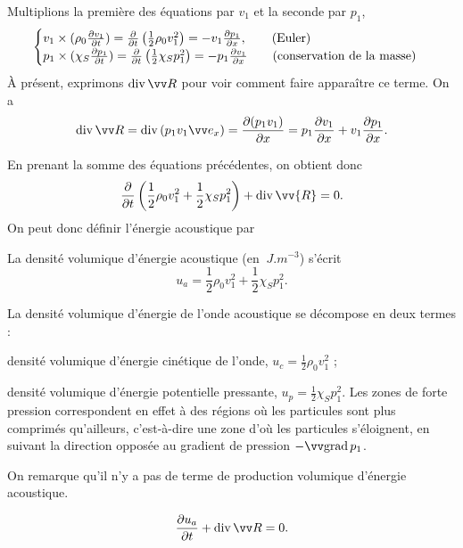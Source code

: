\documentclass[12pt,fancy]{cours}
\begin{document}
Multiplions la première des équations  par $v_1$ et la seconde par $p_1$,
\begin{equation}
\begin{subequations}
  \begin{cases}
  v_1\times(\rho_0\frac{\partial v_1}{\partial t}) = \frac{\partial }{\partial t}\left(\frac{1}{2}\rho_0 v_1^2\right)=-v_1\frac{\partial p_1}{\partial x}, \qquad \text{(Euler)}\\
    p_1\times(\chi_S\frac{\partial p_1}{\partial t}) = \frac{\partial }{\partial t}\left(\frac{1}{2}\chi_S p_1^2\right)=-p_1 \frac{\partial v_1}{\partial x}\qquad \text{(conservation de la masse)}\\
  \end{cases}
	\end{subequations}
  \end{equation}
	À présent, exprimons $\dive \Vec{R}$ pour voir comment faire apparaître ce terme. On a
\begin{equation}
	\dive \Vec{R} = \dive (p_1 v_1 \ex) = \dr{(p_1 v_1)}{x}  = p_1 \dr{v_1}{x} + v_1 \dr{p_1}{x}.
\end{equation}

  En prenant la somme des équations précédentes, on obtient donc
  \begin{equation}
  \frac{\partial}{\partial t}\left(\frac{1}{2}\rho_0 v_1^2+\frac{1}{2}\chi_S p_1^2\right)+\dive{\vv{R}}=0.
  \end{equation}
	On peut donc définir l'énergie acoustique par
	\begin{definition}\label{def:}
		La densité volumique d'énergie acoustique (en $\SI{}{J.m^{-3}}$) s'écrit
		$$u_{a} = \frac{1}{2}\rho_0 v_1^2+\frac{1}{2}\chi_S p_1^2.$$
	\end{definition}

  La densité volumique d'énergie de l'onde acoustique se décompose en deux termes :
\begin{liste}
	\item densité volumique d'énergie cinétique de l'onde, $u_c = \frac{1}{2}\rho_0 v_1^2$ ;
	\item densité volumique d'énergie potentielle pressante, $u_p = \frac{1}{2}\chi_S p_1^2$. Les zones de forte pression correspondent en effet à des régions où les particules sont plus comprimés qu'ailleurs, c'est-à-dire une zone d'où les particules s'éloignent, en suivant la direction opposée au gradient de pression $-\grad p_1$.
\end{liste}
On remarque qu'il n'y a pas de terme de production volumique d'énergie acoustique.
\begin{theorem}\label{form:}
$$
\dr{u_a}{t} + \dive \Vec{R} = 0.
$$
\end{theorem}
\end{document}
